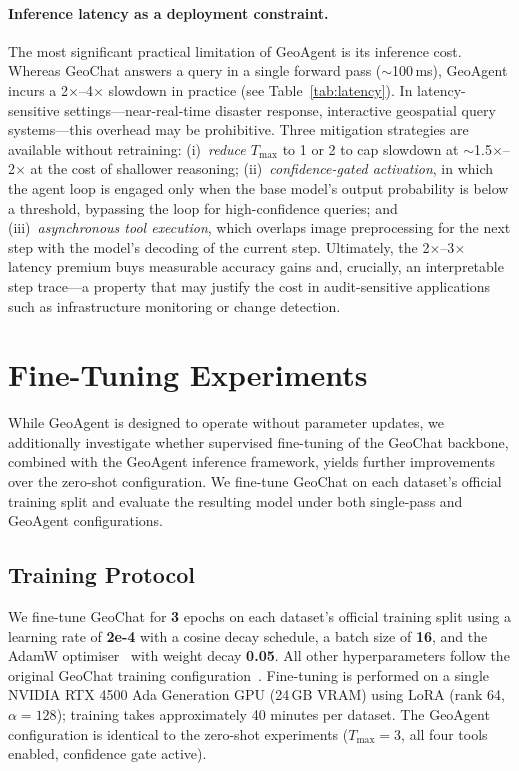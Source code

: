 \documentclass{article}
\begin{document}
\paragraph{Inference latency as a deployment constraint.}
The most significant practical limitation of GeoAgent is its inference cost.
Whereas GeoChat answers a query in a single forward pass ($\sim$100\,ms), GeoAgent
incurs a 2$\times$--4$\times$ slowdown in practice (see Table~\ref{tab:latency}).
In latency-sensitive settings---near-real-time disaster response, interactive
geospatial query systems---this overhead may be prohibitive.  Three mitigation
strategies are available without retraining: (i)~\emph{reduce $T_{\max}$} to 1 or 2
to cap slowdown at $\sim$1.5$\times$--2$\times$ at the cost of shallower reasoning;
(ii)~\emph{confidence-gated activation}, in which the agent loop is engaged only
when the base model's output probability is below a threshold, bypassing the loop
for high-confidence queries; and (iii)~\emph{asynchronous tool execution}, which
overlaps image preprocessing for the next step with the model's decoding of the
current step.  Ultimately, the 2$\times$--3$\times$ latency premium buys measurable
accuracy gains and, crucially, an interpretable step trace---a property that may
justify the cost in audit-sensitive applications such as infrastructure monitoring
or change detection.

\section{Fine-Tuning Experiments}
\label{sec:finetune}

While GeoAgent is designed to operate without parameter updates, we
additionally investigate whether supervised fine-tuning of the GeoChat
backbone, combined with the GeoAgent inference framework, yields further
improvements over the zero-shot configuration.  We fine-tune GeoChat on
each dataset's official training split and evaluate the resulting model
under both single-pass and GeoAgent configurations.

\subsection{Training Protocol}

We fine-tune GeoChat for \textbf{3} epochs on each dataset's official
training split using a learning rate of \textbf{2e-4} with a cosine decay
schedule, a batch size of \textbf{16}, and the AdamW
optimiser~\citep{loshchilov2019decoupled} with weight decay \textbf{0.05}.
All other hyperparameters follow the original GeoChat training
configuration~\citep{kuckreja2024geochat}.  Fine-tuning is performed on a
single NVIDIA RTX 4500 Ada Generation GPU (24\,GB VRAM) using LoRA (rank 64, $\alpha=128$); training
takes approximately 40 minutes per dataset.  The GeoAgent configuration is
identical to the zero-shot experiments ($T_{\max}=3$, all four tools
enabled, confidence gate active).
\end{document}
